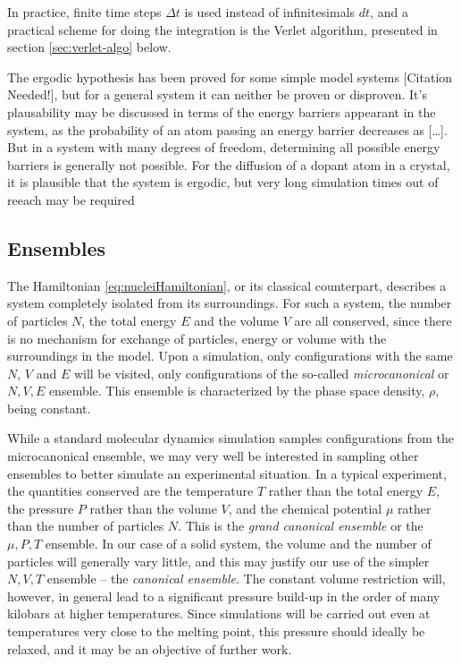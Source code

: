 \documentclass[11pt,bibliography=totoc,index=totoc]{scrbook}   %
\begin{document}
In practice, finite time steps $\Delta t$ is used instead of infinitesimals $dt$, and a practical scheme for doing
the integration is the Verlet algorithm, presented in section \ref{sec:verlet-algo} below.

The ergodic hypothesis has been proved for some simple model systems [Citation Needed!], 
but for a general system it can neither be proven or disproven. 
It's plausability may be discussed in terms of the energy barriers appearant in the system,
as the probability of an atom passing an energy barrier decreases as [\ldots]. 
But in a system with many degrees of freedom, determining all possible energy barriers is generally not possible.
For the diffusion of a dopant atom in a crystal, it is plausible that the system is ergodic, but very long
simulation times out of reeach may be required


\subsection{Ensembles}

The Hamiltonian \eqref{eq:nucleiHamiltonian}, or its classical counterpart, describes a system completely isolated from its surroundings.
For such a system, the number of particles $N$, the total energy $E$ and the volume $V$ are all conserved, since there is no mechanism for exchange of particles, energy or volume with the surroundings in the model.
Upon a simulation, only configurations with the same $N$, $V$ and $E$ will be visited, only configurations of the so-called \emph{microcanonical} or $N,V,E$ ensemble. This ensemble is characterized by the phase space density, $\rho$, being constant.

While a standard molecular dynamics simulation samples configurations from the microcanonical ensemble, we may very well be interested in sampling other ensembles to better simulate an experimental situation. 
In a typical experiment, the quantities conserved are the temperature $T$ rather than the total energy $E$, the pressure $P$ rather than the volume $V$, and the chemical potential $\mu$ rather than the number of particles $N$. 
This is the \emph{grand canonical ensemble} or the $\mu,P,T$ ensemble. 
In our case of a solid system, the volume and the number of particles will generally vary little, and this may justify our use of the simpler $N,V,T$ ensemble -- the \emph{canonical ensemble}. 
The constant volume restriction will, however, in general lead to a significant pressure build-up in the order of many kilobars at higher temperatures. 
Since simulations will be carried out even at temperatures very close to the melting point, this pressure should ideally be relaxed, and it may be an objective of further work.
\end{document}

